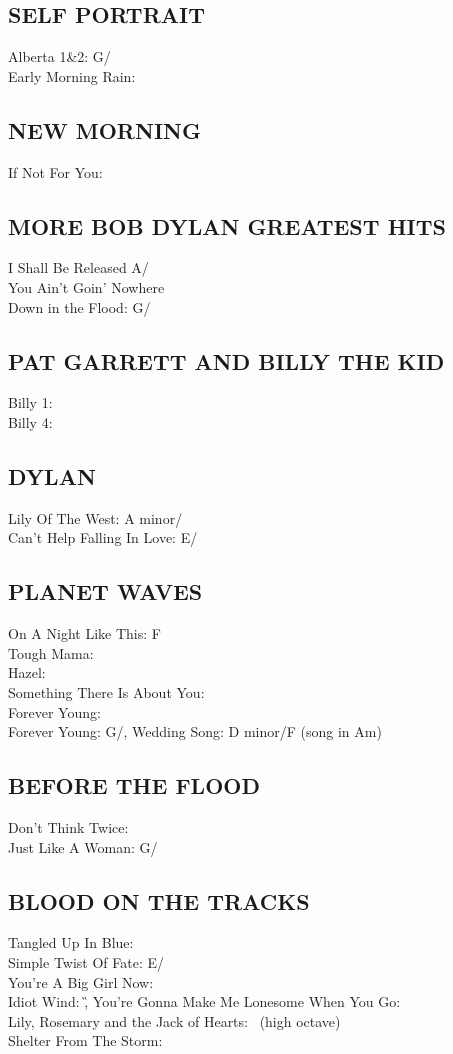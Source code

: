 \subsection{SELF PORTRAIT}
Alberta 1\&2: G/\C\\ Early Morning Rain: \C


\subsection{NEW MORNING}
If Not For You: \E


\subsection{MORE BOB DYLAN GREATEST HITS}
I Shall Be Released A/\D\\
You Ain't Goin' Nowhere \G\\
Down in the Flood: G/\C


\subsection{PAT GARRETT AND BILLY THE KID}
Billy 1: \G\\ Billy 4: \A


\subsection{DYLAN}
Lily Of The West: A minor/\C\\ Can't Help Falling In Love:
E/\A


\subsection{PLANET WAVES}
On A Night Like This: F\\ Tough Mama: \D\\ Hazel: \E\\ Something There Is About You: \G\\ Forever Young: \D\\ Forever Young: G/\C,
Wedding Song: D minor/F (song in Am)


\subsection{BEFORE THE FLOOD}
Don't Think Twice: \C\\ Just Like A Woman: G/\C


\subsection{BLOOD ON THE TRACKS}
Tangled Up In Blue: \A\\ Simple Twist Of Fate: E/\A\\ You're A Big Girl Now: \G\\ Idiot Wind: \G,
You're Gonna Make Me Lonesome When You Go: \E\\ Lily, Rosemary and the Jack of Hearts: \D\ (high octave)\\ Shelter From The Storm: \E


